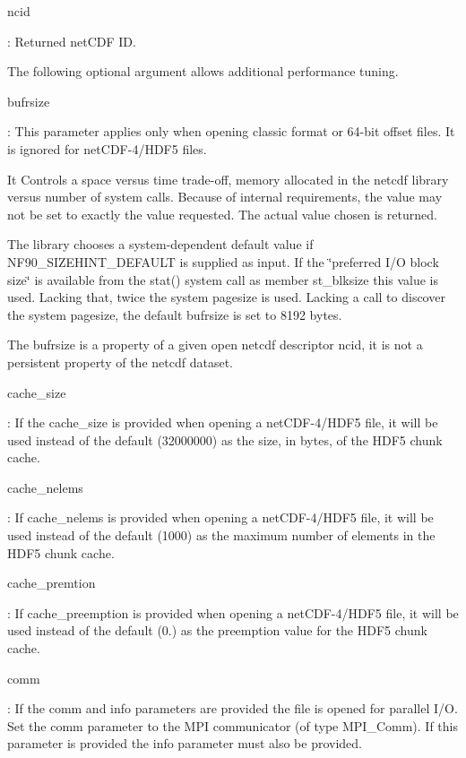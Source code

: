 {\ttfamily ncid}

\+: Returned net\+C\+DF ID.

The following optional argument allows additional performance tuning.

{\ttfamily bufrsize}

\+: This parameter applies only when opening classic format or 64-\/bit offset files. It is ignored for net\+C\+D\+F-\/4/\+H\+D\+F5 files.

It Controls a space versus time trade-\/off, memory allocated in the netcdf library versus number of system calls. Because of internal requirements, the value may not be set to exactly the value requested. The actual value chosen is returned.

The library chooses a system-\/dependent default value if N\+F90\+\_\+\+S\+I\+Z\+E\+H\+I\+N\+T\+\_\+\+D\+E\+F\+A\+U\+LT is supplied as input. If the \char`\"{}preferred I/\+O
    block size\char`\"{} is available from the stat() system call as member st\+\_\+blksize this value is used. Lacking that, twice the system pagesize is used. Lacking a call to discover the system pagesize, the default bufrsize is set to 8192 bytes.

The bufrsize is a property of a given open netcdf descriptor ncid, it is not a persistent property of the netcdf dataset.

{\ttfamily cache\+\_\+size}

\+: If the cache\+\_\+size is provided when opening a net\+C\+D\+F-\/4/\+H\+D\+F5 file, it will be used instead of the default (32000000) as the size, in bytes, of the H\+D\+F5 chunk cache.

{\ttfamily cache\+\_\+nelems}

\+: If cache\+\_\+nelems is provided when opening a net\+C\+D\+F-\/4/\+H\+D\+F5 file, it will be used instead of the default (1000) as the maximum number of elements in the H\+D\+F5 chunk cache.

{\ttfamily cache\+\_\+premtion}

\+: If cache\+\_\+preemption is provided when opening a net\+C\+D\+F-\/4/\+H\+D\+F5 file, it will be used instead of the default (0.) as the preemption value for the H\+D\+F5 chunk cache.

{\ttfamily comm}

\+: If the comm and info parameters are provided the file is opened for parallel I/O. Set the comm parameter to the M\+PI communicator (of type M\+P\+I\+\_\+\+Comm). If this parameter is provided the info parameter must also be provided.

